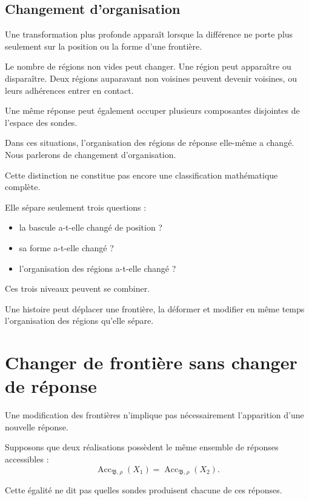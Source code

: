 \subsection{Changement d'organisation}

Une transformation plus profonde apparaît lorsque la différence ne porte plus seulement sur la position ou la forme d'une frontière.

Le nombre de régions non vides peut changer. Une région peut apparaître ou disparaître. Deux régions auparavant non voisines peuvent devenir voisines, ou leurs adhérences entrer en contact.

Une même réponse peut également occuper plusieurs composantes disjointes de l'espace des sondes.

Dans ces situations, l'organisation des régions de réponse elle-même a changé. Nous parlerons de changement d'organisation.

Cette distinction ne constitue pas encore une classification
mathématique complète.

Elle sépare seulement trois questions :

\begin{itemize}
\tightlist
\item
  la bascule a-t-elle changé de position ?
\item
  sa forme a-t-elle changé ?
\item
  l'organisation des régions a-t-elle changé ?
\end{itemize}

Ces trois niveaux peuvent se combiner.

Une histoire peut déplacer une frontière, la déformer et modifier en même temps l'organisation des régions qu'elle sépare.

\section{Changer de frontière sans changer de réponse}
\label{t3-changer-frontiere-sans-changer-reponse}

Une modification des frontières n'implique pas nécessairement
l'apparition d'une nouvelle réponse.

Supposons que deux réalisations possèdent le même ensemble de réponses
accessibles :
\[
\operatorname{Acc}_{\mathfrak B,\rho}(X_1)
=
\operatorname{Acc}_{\mathfrak B,\rho}(X_2).
\]

Cette égalité ne dit pas quelles sondes produisent chacune de ces
réponses.

